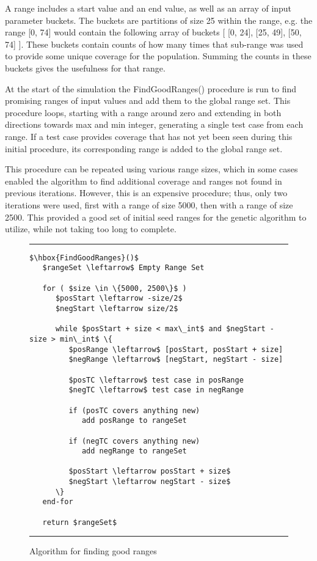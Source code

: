 \documentclass[runningheads]{llncs}
\begin{document}
A range includes a start value and an end value, as well as an array of input parameter buckets. The buckets are partitions of size 25 within the range, e.g. the range [0, 74] would contain the following array of buckets [ [0, 24], [25, 49], [50, 74] ]. These buckets contain counts of how many times that sub-range was used to provide some unique coverage for the population. Summing the counts in these buckets gives the usefulness for that range.

At the start of the simulation the FindGoodRanges() procedure is run to find promising ranges of input values and add them to the global range set. This procedure loops, starting with a range around zero and extending in both directions towards max and min integer, generating a single test case from each range. If a test case provides coverage that has not yet been seen during this initial procedure, its corresponding range is added to the global range set. 

This procedure can be repeated using various range sizes, which in some cases enabled the algorithm to find additional coverage and ranges not found in previous iterations. However, this is an expensive procedure; thus, only two iterations were used, first with a range of size 5000, then with a range of size 2500. This provided a good set of initial seed ranges for the genetic algorithm to utilize, while not taking too long to complete.


\begin{figure}[h!]
\begin{center}
\hrule
\medskip
\begin{Verbatim}[fontfamily=tt, xleftmargin=10pt, commandchars=\\\{\},
codes={\catcode`$=3\catcode`^=7\catcode`_=8}]
$\hbox{FindGoodRanges}()$  
   $rangeSet \leftarrow$ Empty Range Set
		
   for ( $size \in \{5000, 2500\}$ ) 
      $posStart \leftarrow -size/2$
      $negStart \leftarrow size/2$
		
      while $posStart + size < max\_int$ and $negStart - size > min\_int$ \{
         $posRange \leftarrow$ [posStart, posStart + size]
         $negRange \leftarrow$ [negStart, negStart - size]
		
         $posTC \leftarrow$ test case in posRange
         $negTC \leftarrow$ test case in negRange
		
         if (posTC covers anything new)
            add posRange to rangeSet
		
         if (negTC covers anything new)
            add negRange to rangeSet
		
         $posStart \leftarrow posStart + size$
         $negStart \leftarrow negStart - size$
      \}
   end-for
		
   return $rangeSet$
\end{Verbatim}
\hrule
\end{center}
\caption{Algorithm for finding good ranges \label{fig:ranges}}
\end{figure}
\FloatBarrier
\end{document}
